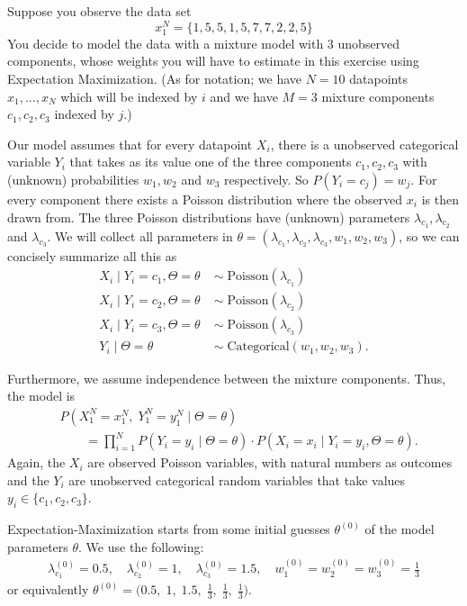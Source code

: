 \documentclass[a4paper,10pt,landscape,twocolumn]{scrartcl}
\begin{document}
\begin{exercise}
	Suppose you observe the data set 
	\[
		x_1^N = \{1, 5, 5, 1, 5, 7, 7, 2, 2, 5\}
	\] 
	You decide to model the data with a mixture model with 3 unobserved components, whose weights you will have to estimate in this exercise using Expectation Maximization. (As for notation; we have $N=10$ datapoints $x_1, \dots, x_N$ which will be indexed by $i$ and we have $M=3$ mixture components $c_1, c_2, c_3$ indexed by $j$.) 
	
	Our model assumes that for every datapoint $X_i$, there is a unobserved categorical variable $Y_i$ that takes as its value one of the three components $c_1, c_2, c_3$ with (unknown) probabilities $w_1, w_2$ and $w_3$ respectively. So $P(Y_i = c_j) = w_j$. For every component there exists a Poisson distribution where the observed $x_i$ is then drawn from. The three Poisson distributions have (unknown) parameters $\lambda_{c_{1}}, \lambda_{c_{2}}$ and $\lambda_{c_{3}}$. We will collect all parameters in $\theta = (\lambda_{c_1}, \lambda_{c_2}, \lambda_{c_3},w_1, w_2, w_3)$, so we can concisely summarize all this as
	\begin{align*}
		X_i \mid Y_i = c_1, \Theta=\theta \; &\sim \; \text{Poisson}(\lambda_{c_1})\\
		X_i \mid Y_i = c_2, \Theta=\theta \; &\sim \; \text{Poisson}(\lambda_{c_2})\\
		X_i \mid Y_i = c_3, \Theta=\theta \; &\sim \; \text{Poisson}(\lambda_{c_3})\\
		Y_i \mid \Theta=\theta \; &\sim \; \text{Categorical}(w_1, w_2, w_3).
	\end{align*}

	Furthermore, we assume independence between the mixture components. Thus, the model is
	\begin{align*}
	&P(X_1^N=x_1^N, \;Y_1^N=y_1^N\mid \Theta=\theta) \\
		&\qquad= \prod_{i=1}^N P(Y_{i}=y_{i} \mid \Theta=\theta) \cdot P(X_{i}=x_{i}\mid Y_{i}=y_{i}, \Theta=\theta).
	\end{align*}
	Again, the $X_i$ are observed Poisson variables, with natural numbers as outcomes and the $Y_i$ are unobserved categorical random variables that take values $y_i \in \{c_1, c_2, c_3\}$.
	
	Expectation-Maximization starts from some initial guesses $\theta^{(0)}$ of the model parameters $\theta$. We use the following:
	\begin{align*}
	 \lambda_{c_1}^{(0)}  = 0.5, \quad \lambda_{c_2}^{(0)} = 1, \quad
          \lambda_{c_3}^{(0)} = 1.5, \quad w_1^{(0)} = w_2^{(0)} = w_3^{(0)} = \frac{1}{3}
	\end{align*}
	or equivalently $\theta^{(0)} = \bigl(0.5,\; 1,\; 1.5, \; \frac{1}{3},\; \frac 1 3,\; \frac 1 3 \bigr)$.


\end{exercise}
\end{document}
